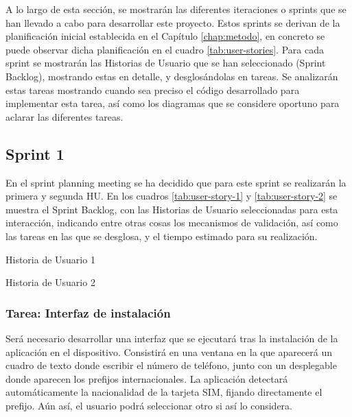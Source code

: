 A lo largo de esta sección, se mostrarán las diferentes iteraciones o sprints que se han llevado a cabo para desarrollar este proyecto. Estos sprints se derivan de la planificación inicial establecida en el Capítulo \ref{chap:metodo}, en concreto se puede observar dicha planificación en el cuadro \ref{tab:user-stories}. Para cada sprint se mostrarán las Historias de Usuario que se han seleccionado (Sprint Backlog), mostrando estas en detalle, y desglosándolas en tareas. Se analizarán estas tareas mostrando cuando sea preciso el código desarrollado para implementar esta tarea, así como los diagramas que se considere oportuno para aclarar las diferentes tareas.

\subsection{Sprint 1}

En el sprint planning meeting se ha decidido que para este sprint se realizarán la primera y segunda \ac{HU}. En los cuadros \ref{tab:user-story-1} y \ref{tab:user-story-2} se muestra el Sprint Backlog, con las Historias de Usuario seleccionadas para esta interacción, indicando entre otras cosas los mecanismos de validación, así como las tareas en las que se desglosa, y el tiempo estimado para su realización.

\begin{table}[hp]
  \centering
  {\small
  
  }
  \caption{Historia de Usuario 1}
  \label{tab:user-story-1}
\end{table}

\begin{table}[hp]
  \centering
  {\small
  
  }
  \caption{Historia de Usuario 2}
  \label{tab:user-story-2}
\end{table}

\subsubsection{Tarea: Interfaz de instalación}

Será necesario desarrollar una interfaz que se ejecutará tras la instalación de la aplicación en el dispositivo. Consistirá en una ventana en la que aparecerá un cuadro de texto donde escribir el número de teléfono, junto con un desplegable donde aparecen los prefijos internacionales. La aplicación detectará automáticamente la nacionalidad de la tarjeta SIM, fijando directamente el prefijo. Aún así, el usuario podrá seleccionar otro si así lo considera.

